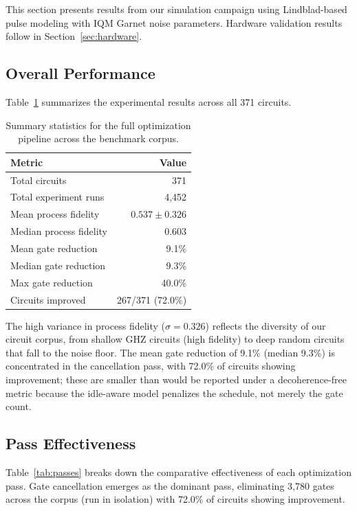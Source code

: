 \documentclass[sigconf,nonacm]{acmart}
\begin{document}
This section presents results from our simulation campaign using Lindblad-based pulse modeling with IQM Garnet noise parameters. Hardware validation results follow in Section~\ref{sec:hardware}.

\subsection{Overall Performance}

Table~\ref{tab:summary} summarizes the experimental results across all 371 circuits.

\begin{table}[t]
\centering
\caption{Summary statistics for the full optimization pipeline across the benchmark corpus.}
\label{tab:summary}
\begin{tabular}{lr}
\toprule
\textbf{Metric} & \textbf{Value} \\
\midrule
Total circuits & 371 \\
Total experiment runs & 4{,}452 \\
\midrule
Mean process fidelity & $0.537 \pm 0.326$ \\
Median process fidelity & 0.603 \\
\midrule
Mean gate reduction & 9.1\% \\
Median gate reduction & 9.3\% \\
Max gate reduction & 40.0\% \\
Circuits improved & 267/371 (72.0\%) \\
\bottomrule
\end{tabular}
\end{table}

The high variance in process fidelity ($\sigma = 0.326$) reflects the diversity of our circuit corpus, from shallow GHZ circuits (high fidelity) to deep random circuits that fall to the noise floor. The mean gate reduction of 9.1\% (median 9.3\%) is concentrated in the cancellation pass, with 72.0\% of circuits showing improvement; these are smaller than would be reported under a decoherence-free metric because the idle-aware model penalizes the schedule, not merely the gate count.

\subsection{Pass Effectiveness}

Table~\ref{tab:passes} breaks down the comparative effectiveness of each optimization pass. Gate cancellation emerges as the dominant pass, eliminating 3{,}780 gates across the corpus (run in isolation) with 72.0\% of circuits showing improvement.
\end{document}
